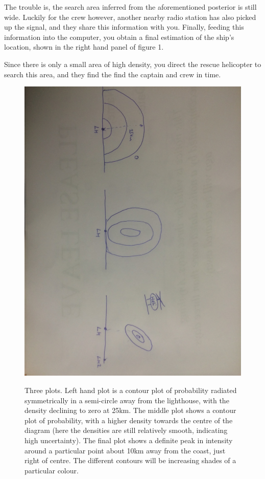 \documentclass[11pt,fullpage]{book}
\begin{document}
The trouble is, the search area inferred from the aforementioned posterior is still wide. Luckily for the crew however, another nearby radio station has also picked up the signal, and they share this information with you. Finally, feeding this information into the computer, you obtain a final estimation of the ship's location, shown in the right hand panel of figure 1. 

Since there is only a small area of high density, you direct the rescue helicopter to search this area, and they find the find the captain and crew in time.

\begin{figure}
\centering
\scalebox{0.2} 
{\includegraphics{Posterior_bayesianLighthouse.jpg}}
\caption{Three plots. Left hand plot is a contour plot of probability radiated symmetrically in a semi-circle away from the lighthouse, with the density declining to zero at 25km. The middle plot shows a contour plot of probability, with a higher density towards the centre of the diagram (here the densities are still relatively smooth, indicating high uncertainty). The final plot shows a definite peak in intensity around a particular point about 10km away from the coast, just right of centre. The different contours will be increasing shades of a particular colour.}\label{fig:Posterior_bayesianLighthouse}
\end{figure}
\end{document}
